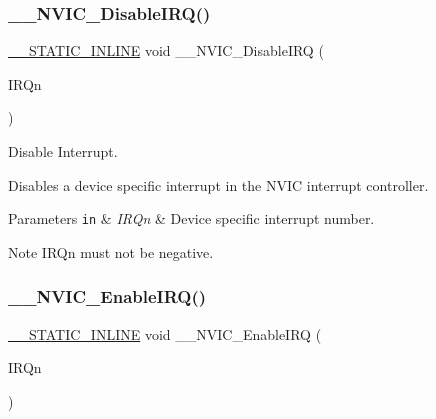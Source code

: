 \subsubsection{\texorpdfstring{\+\_\+\+\_\+\+N\+V\+I\+C\+\_\+\+Disable\+I\+R\+Q()}{\_\_NVIC\_DisableIRQ()}}
{\footnotesize\ttfamily \mbox{\hyperlink{cmsis__iccarm_8h_aba87361bfad2ae52cfe2f40c1a1dbf9c}{\+\_\+\+\_\+\+S\+T\+A\+T\+I\+C\+\_\+\+I\+N\+L\+I\+NE}} void \+\_\+\+\_\+\+N\+V\+I\+C\+\_\+\+Disable\+I\+RQ (\begin{DoxyParamCaption}\item[{\mbox{\hyperlink{group___interrupt__vector__numbers_gac3af4a32370fb28c4ade8bf2add80251}{I\+R\+Qn\+\_\+\+Type}}}]{I\+R\+Qn }\end{DoxyParamCaption})}



Disable Interrupt. 

Disables a device specific interrupt in the N\+V\+IC interrupt controller. 
\begin{DoxyParams}[1]{Parameters}
\mbox{\tt in}  & {\em I\+R\+Qn} & Device specific interrupt number. \\
\hline
\end{DoxyParams}
\begin{DoxyNote}{Note}
I\+R\+Qn must not be negative. 
\end{DoxyNote}
\mbox{\label{group___c_m_s_i_s___core___n_v_i_c_functions_ga71227e1376cde11eda03fcb62f1b33ea}} 
\subsubsection{\texorpdfstring{\+\_\+\+\_\+\+N\+V\+I\+C\+\_\+\+Enable\+I\+R\+Q()}{\_\_NVIC\_EnableIRQ()}}
{\footnotesize\ttfamily \mbox{\hyperlink{cmsis__iccarm_8h_aba87361bfad2ae52cfe2f40c1a1dbf9c}{\+\_\+\+\_\+\+S\+T\+A\+T\+I\+C\+\_\+\+I\+N\+L\+I\+NE}} void \+\_\+\+\_\+\+N\+V\+I\+C\+\_\+\+Enable\+I\+RQ (\begin{DoxyParamCaption}\item[{\mbox{\hyperlink{group___interrupt__vector__numbers_gac3af4a32370fb28c4ade8bf2add80251}{I\+R\+Qn\+\_\+\+Type}}}]{I\+R\+Qn }\end{DoxyParamCaption})}



